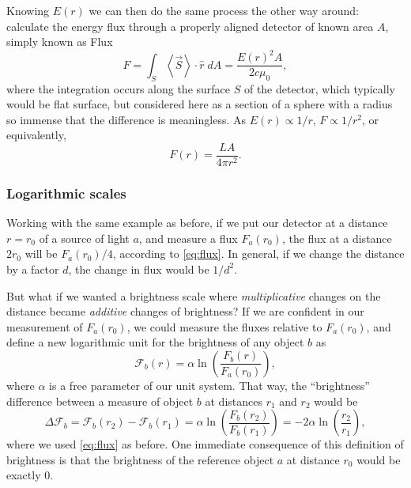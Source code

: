 	Knowing $E(r)$ we can then do the same process the other way around: 
	calculate the energy flux through a properly aligned detector of known area $A$,
	simply known as Flux	
	\begin{equation}
		F = \int_{S} \left<\vec S\right> \cdot \hat r \; dA = \frac{E(r)^2 A}{2 c \mu_0},
	\end{equation}
	where the integration occurs along the surface $S$ of the detector, which typically would be flat surface, 
	but considered here as a section of a sphere with a radius so immense that the difference is meaningless.
	As $E(r)\propto 1/r$, $F\propto 1/r^2$,  or equivalently, 
	\begin{equation}
		F(r)=\frac{L A}{4\pi r^2}. \label{eq:flux}
	\end{equation}
	
	\subsubsection{Logarithmic scales}
	
	Working with the same example as before, if we put our detector at a distance $r=r_0$ of a source of light $a$,
	and measure a flux $F_a(r_0)$,
	the flux at a distance $2r_0$ will be $F_a(r_0)/4$, according to \autoref{eq:flux}. 
	In general, if we change the distance by a factor $d$, the change in flux would be $1/d^2$.
	
	But what if we wanted a brightness scale where \textit{multiplicative} changes on the distance became \textit{additive} changes of brightness?
	If we are confident in our measurement of $F_a(r_0)$, we could measure the fluxes relative to $F_a(r_0)$, 
	and define a new logarithmic unit for the brightness of any object $b$ as
	\begin{equation}
		\mathcal{F}_b(r) = \alpha \ln\left(\frac{F_b(r)}{F_a(r_0)}\right), \label{eq:general-magnitude}
	\end{equation}
	where $\alpha$ is a free parameter of our unit system. 
	That way, the \enquote{brightness} difference between a measure of object $b$ at distances $r_1$ and $r_2$ would be
	\begin{equation}
		\Delta \mathcal{F}_b = \mathcal{F}_b(r_2) - \mathcal{F}_b(r_1) 
			= \alpha \ln\left(\frac{F_b(r_2)}{F_b(r_1)}\right)
			= -2\alpha \ln\left(\frac{r_2}{r_1}\right),
			\label{eq:general-distance-modulus}
	\end{equation}
	where we used \autoref{eq:flux} as before. 
	One immediate consequence of this definition of brightness is that the brightness of the reference object $a$ at distance $r_0$ would be exactly 0.
	
